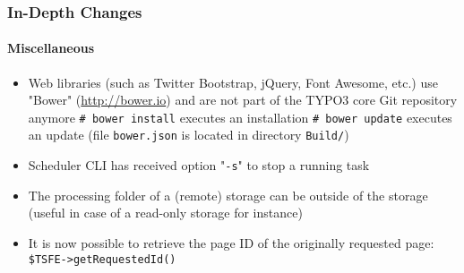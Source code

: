 \begin{frame}[fragile]
	\frametitle{In-Depth Changes}
	\framesubtitle{Miscellaneous}

	\begin{itemize}

		\item Web libraries (such as Twitter Bootstrap, jQuery, Font Awesome, etc.) use
			"Bower" (\url{http://bower.io}) and are not part of the TYPO3 core Git repository
			anymore\newline
			\small
				\texttt{\# bower install}	\tabto{3.4cm}executes an installation\newline
				\texttt{\# bower update}		\tabto{3.4cm}executes an update\newline
			\normalsize
			(file \texttt{bower.json} is located in directory \texttt{Build/})

		\item Scheduler CLI has received option "\texttt{-s}" to stop a running task

		\item The processing folder of a (remote) storage can be outside of the
			storage (useful in case of a read-only storage for instance)

		\item It is now possible to retrieve the page ID of the originally requested page:
			\texttt{\$TSFE->getRequestedId()}

	\end{itemize}

\end{frame}

